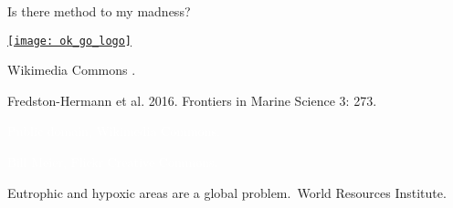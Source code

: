 \documentclass[t]{beamer}
\begin{document}

\begin{frame}[c]{Is there method to my madness?}

\begin{center}
	\href{https://www.youtube.com/watch?v=qybUFnY7Y8w}{\texttt{[image: ok\_go\_logo]}}

\end{center}

\end{frame}


{
\begin{frame}[b]

\hfill \tiny Wikimedia Commons .
\end{frame}
}

{
\begin{frame}[b]

\hfill \tiny Fredston-Hermann et al. 2016. Frontiers in Marine Science 3: 273.
\end{frame}
}


{
\begin{frame}[b]

\hfill\tiny\textcolor{white}{Public domain, Wikimedia Commons.}
\end{frame}
}

{
\begin{frame}[b]%

\tiny\textcolor{white}{ Bill Meier, Flickr Creative Commons.}
\end{frame}
}

{
\begin{frame}[b]


\hspace*{122mm}
\end{frame}
}

{
\begin{frame}[b]{Eutrophic and hypoxic areas are a global problem.}
\hfill\tiny\textcopyright\,World Resources Institute.
\end{frame}
}
\end{document}
